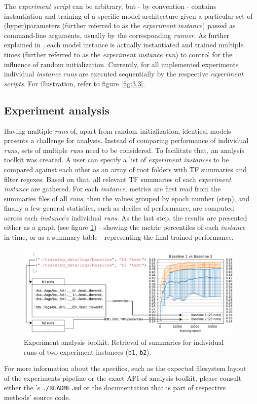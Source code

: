 The \textit{experiment script} can be arbitrary, but - by convention - contains instantiation and training of a specific model architecture given a particular set of (hyper)parameters (further referred to as the \textit{experiment instance}) passed as command-line arguments, usually by the corresponding \textit{runner}. As further explained in , each model instance is actually instantiated and trained multiple times (further referred to as the \textit{experiment instance run}) to control for the influence of random initialization. Currently, for all implemented experiments individual \textit{instance runs} are executed sequentially by the respective \textit{experiment scripts}. For illustration, refer to figure \ref{fig:3.3}.

\subsection{Experiment analysis}
Having multiple \textit{runs} of, apart from random initialization, identical models pre\-sents a challenge for analysis. Instead of comparing performance of individual \textit{runs}, sets of multiple \textit{runs} need to be considered. To facilitate that, an analysis toolkit was created. A user can specify a list of \textit{experiment instances} to be compared against each other as an array of root folders with TF summaries and filter regexes. Based on that, all relevant TF summaries of each \textit{experiment instance} are gathered. For each \textit{instance}, metrics are first read from the summaries files of all \textit{runs}, then the values grouped by epoch number (step), and finally a few general statistics, such as deciles of performance, are computed across each \textit{instance}’s individual \textit{runs}. As the last step, the results are presented either as a graph (see figure \ref{fig:3.4}) - showing the metric percentiles of each \textit{instance} in time, or as a summary table - representing the final trained performance. 

\begin{figure}[ht]
    \centering
    \includegraphics[width=1\textwidth]{../figures/03_msc-neuro_2}
    \caption[Experiment analysis toolkit]{Experiment analysis toolkit: Retrieval of summaries for individual runs of two experiment instances (\texttt{b1}, \texttt{b2}).}
    \label{fig:3.4}
\end{figure}

For more information about the specifics, such as the expected filesystem layout of the experiments pipeline or the exact API of analysis toolkit, please consult either the ’s \texttt{./README.md} or the documentation that is part of respective methods’ source code. 
